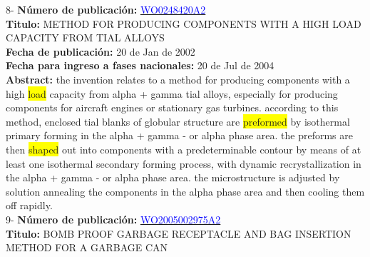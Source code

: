  \vspace{1cm}8- \textbf{Número de publicación:} \href{https://worldwide.espacenet.com/publicationDetails/biblio?DB=EPODOC&II=0&ND=3&adjacent=true&locale=en_EP&FT=D&date=20160331&CC=WO&NR=0248420A2&KC=#}{\textcolor{blue}{WO0248420A2}}\\ 
\textbf{Titulo:} METHOD FOR PRODUCING COMPONENTS WITH A HIGH LOAD CAPACITY FROM TIAL ALLOYS\\ 
 
\textbf{Fecha de publicación:} 20 de Jan de 2002\\ 
\textbf{Fecha para ingreso a fases nacionales:} 20 de Jul de 2004\\ 
\textbf{Abstract:} the invention relates to a method for producing components with a high \colorbox{yellow}{\colorbox{yellow}{\colorbox{yellow}{load}}} capacity from alpha + gamma tial alloys, especially for producing components for aircraft engines or stationary gas turbines. according to this method, enclosed tial blanks of globular structure are \colorbox{yellow}{preformed} by isothermal primary forming in the alpha + gamma - or alpha phase area. the preforms are then \colorbox{yellow}{shaped} out into components with a predeterminable contour by means of at least one isothermal secondary forming process, with dynamic recrystallization in the alpha + gamma - or alpha phase area. the microstructure is adjusted by solution annealing the components in the alpha phase area and then cooling them off rapidly.\\ 
 

 \vspace{1cm}9- \textbf{Número de publicación:} \href{https://worldwide.espacenet.com/publicationDetails/biblio?DB=EPODOC&II=0&ND=3&adjacent=true&locale=en_EP&FT=D&date=20160331&CC=WO&NR=2005002975A2&KC=A2#}{\textcolor{blue}{WO2005002975A2}}\\ 
\textbf{Titulo:} BOMB PROOF GARBAGE RECEPTACLE AND BAG INSERTION METHOD FOR A GARBAGE CAN\\ 
 
